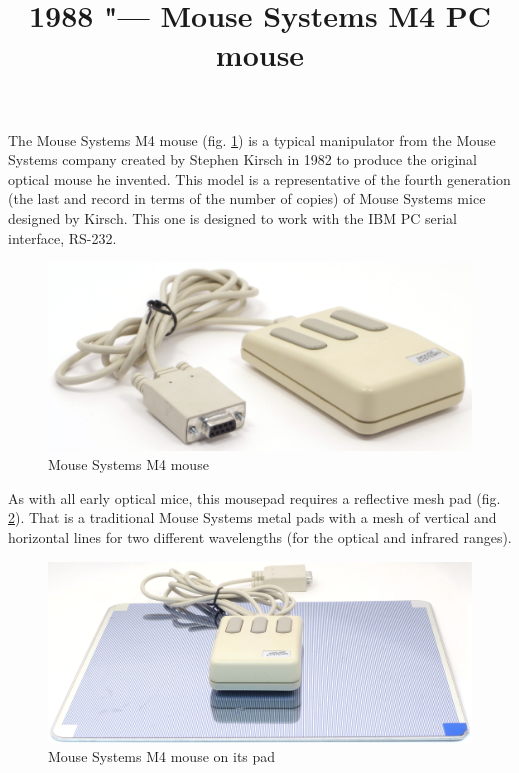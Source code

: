 \documentclass[11pt, a4paper]{article}
\begin{document}
\title{1988 "--- Mouse Systems M4 PC mouse}
\date{}
\maketitle
{}
The Mouse Systems M4 mouse (fig. \ref{fig:mscM4Pic}) is a typical manipulator from the Mouse Systems company created by Stephen Kirsch in 1982 to produce the original optical mouse he invented. This model is a representative of the fourth generation (the last and record in terms of the number of copies) of Mouse Systems mice designed by Kirsch. This one is designed to work with the IBM PC serial interface, RS-232.

\begin{figure}[h]
    \centering
    \includegraphics[scale=0.5]{1988_mouse_systems_m4/pic_30.jpg}
    \caption{Mouse Systems M4 mouse}
    \label{fig:mscM4Pic}
\end{figure}

As with all early optical mice, this mousepad requires a reflective mesh pad (fig. \ref{fig:mscM4Pad}). That is a traditional Mouse Systems metal pads with a mesh of vertical and horizontal lines for two different wavelengths (for the optical and infrared ranges).

\begin{figure}[h]
    \centering
    \includegraphics[scale=0.4]{1988_mouse_systems_m4/pad_30.jpg}
    \caption{Mouse Systems M4 mouse on its pad}
    \label{fig:mscM4Pad}
\end{figure}
\end{document}
